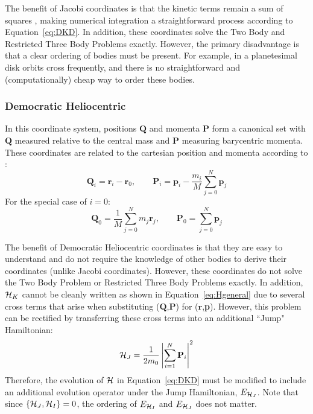 The benefit of Jacobi coordinates is that the kinetic terms remain a sum of squares \citep{Plummer1918}, making numerical integration a straightforward process according to Equation~\ref{eq:DKD}. 
In addition, these coordinates solve the Two Body and Restricted Three Body Problems exactly. 
However, the primary disadvantage is that a clear ordering of bodies must be present. 
For example, in a planetesimal disk orbits cross frequently, and there is no straightforward and (computationally) cheap way to order these bodies. 

\subsubsection{Democratic Heliocentric}
\label{sec:DH}
In this coordinate system, positions $\textbf{Q}$ and momenta $\textbf{P}$ form a canonical set with $\textbf{Q}$ measured relative to the central mass and $\textbf{P}$ measuring barycentric momenta.
These coordinates are related to the cartesian position and momenta according to \citep{Duncan1998}:
\begin{equation}
\textbf{Q}_i = \textbf{r}_i - \textbf{r}_0, \qquad
\textbf{P}_i = \textbf{p}_i - \frac{m_i}{M}\sum_{j=0}^N \textbf{p}_j
\end{equation}
For the special case of $i=0$:
\begin{equation}
\textbf{Q}_0 = \frac{1}{M} \sum_{j=0}^N m_j \textbf{r}_j, \qquad
\textbf{P}_0 = \sum_{j=0}^{N} \textbf{p}_j
\end{equation}

The benefit of Democratic Heliocentric coordinates is that they are easy to understand and do not require the knowledge of other bodies to derive their coordinates (unlike Jacobi coordinates). 
However, these coordinates do not solve the Two Body Problem or Restricted Three Body Problems exactly. 
In addition, $\mathcal{H}_K$ cannot be cleanly written as shown in Equation~\ref{eq:Hgeneral} due to several cross terms that arise when substituting ($\textbf{Q}$,\textbf{P}) for ($\textbf{r}$,\textbf{p}).
However, this problem can be rectified by transferring these cross terms into an additional ``Jump" Hamiltonian:
\begin{equation}
\mathcal{H}_J = \frac{1}{2m_0} \left|\sum_{i=1}^N \textbf{P}_i\right|^2
\end{equation}
Therefore, the evolution of $\mathcal{H}$ in Equation~\ref{eq:DKD} must be modified to include an additional evolution operator under the Jump Hamiltonian, $E_{\mathcal{H}_J}$.
Note that since $\{\mathcal{H}_J, \mathcal{H}_I\} = 0$, the ordering of $E_{\mathcal{H}_I}$ and $E_{\mathcal{H}_J}$ does not matter. 

